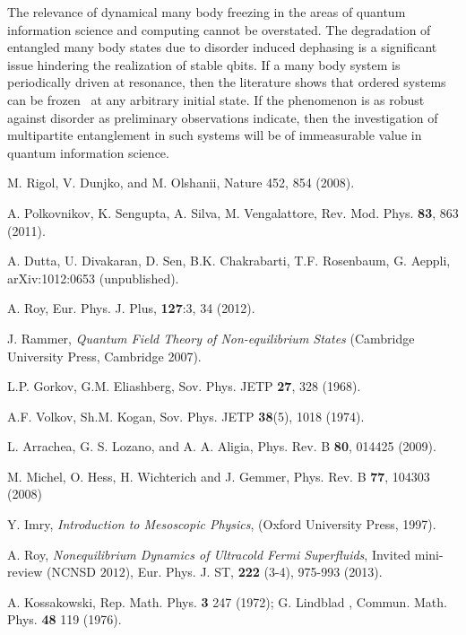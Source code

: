 \documentclass[a4paper,9pt]{article}
\renewenvironment{thebibliography}[1]{%
    \begin{oldthebibliography}{#1}%
      \setlength{\parskip}{0ex}%
      \setlength{\itemsep}{0ex}%
  }%
  {%
    \end{oldthebibliography}%
  }
\begin{document}
The relevance of dynamical many body freezing in the areas of quantum information science and computing cannot be overstated. The degradation of entangled many body states due to disorder induced dephasing is a significant issue hindering the realization of stable qbits. If a many body system is periodically driven at resonance, then the literature shows that ordered systems can be frozen~\cite{dmfth} at any arbitrary initial state. If the phenomenon is as robust against disorder as preliminary observations indicate, then the investigation of multipartite entanglement in such systems will be of immeasurable value in quantum information science.
\newpage

\begin{thebibliography}{}

M. Rigol, V. Dunjko, and M. Olshanii, Nature 452, 854 (2008).

A. Polkovnikov, K. Sengupta, A. Silva, M. Vengalattore, Rev. Mod. Phys. \textbf{83}, 863 (2011).

A. Dutta, U. Divakaran, D. Sen, B.K. Chakrabarti, T.F. Rosenbaum, G. Aeppli, arXiv:1012:0653 (unpublished).

A. Roy, Eur. Phys. J. {Plus}, {\bf 127}:3, 34 (2012).

J. Rammer, \textit{Quantum Field Theory of Non-equilibrium States} (Cambridge University Press, Cambridge 2007).

L.P. Gorkov, G.M. Eliashberg, Sov. Phys. JETP \textbf{27}, 328 (1968).

A.F. Volkov, Sh.M. Kogan, Sov. Phys. JETP \textbf{38}(5), 1018 (1974).

L. Arrachea, G. S. Lozano, and A. A. Aligia, Phys. Rev. B {\bf 80}, 014425 (2009).

M. Michel, O. Hess,  H. Wichterich and J. Gemmer, Phys. Rev. B {\bf 77}, 104303 (2008) 

Y. Imry, \textit{Introduction to Mesoscopic Physics}, (Oxford University Press, 1997).

A. Roy, \textit{Nonequilibrium Dynamics of Ultracold Fermi Superfluids}, Invited mini-review (NCNSD $2012$),
Eur. Phys. J. ST, {\bf 222} (3-4), 975-993 (2013).

A. Kossakowski, Rep. Math. Phys. {\bf 3} 247 (1972); G. Lindblad , Commun. Math. Phys. {\bf 48} 119 (1976).


\end{thebibliography}
\end{document}
